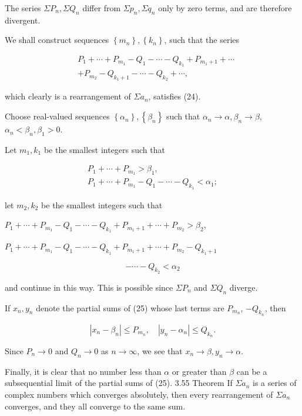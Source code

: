 \documentclass[10pt]{article}
\begin{document}
The series $\Sigma P_{n}, \Sigma Q_{n}$ differ from $\Sigma p_{n}, \Sigma q_{n}$ only by zero terms, and are therefore divergent.

We shall construct sequences $\left\{m_{n}\right\},\left\{k_{n}\right\}$, such that the series

$$
\begin{aligned}
& P_{1}+\cdots+P_{m_{1}}-Q_{1}-\cdots-Q_{k_{1}}+P_{m_{1}+1}+\cdots \\
&+P_{m_{2}}-Q_{k_{1}+1}-\cdots-Q_{k_{2}}+\cdots,
\end{aligned}
$$

which clearly is a rearrangement of $\Sigma a_{n}$, satisfies (24).

Choose real-valued sequences $\left\{\alpha_{n}\right\},\left\{\beta_{n}\right\}$ such that $\alpha_{n} \rightarrow \alpha, \beta_{n} \rightarrow \beta$, $\alpha_{n}<\beta_{n}, \beta_{1}>0$.

Let $m_{1}, k_{1}$ be the smallest integers such that

$$
\begin{gathered}
P_{1}+\cdots+P_{m_{1}}>\beta_{1}, \\
P_{1}+\cdots+P_{m_{1}}-Q_{1}-\cdots-Q_{k_{1}}<\alpha_{1} ;
\end{gathered}
$$

let $m_{2}, k_{2}$ be the smallest integers such that

$P_{1}+\cdots+P_{m_{1}}-Q_{1}-\cdots-Q_{k_{1}}+P_{m_{1}+1}+\cdots+P_{m_{2}}>\beta_{2}$,

$P_{1}+\cdots+P_{m_{1}}-Q_{1}-\cdots-Q_{k_{1}}+P_{m_{1}+1}+\cdots+P_{m_{2}}-Q_{k_{1}+1}$

$$
-\cdots-Q_{k_{2}}<\alpha_{2}
$$

and continue in this way. This is possible since $\Sigma P_{n}$ and $\Sigma Q_{n}$ diverge.

If $x_{n}, y_{n}$ denote the partial sums of (25) whose last terms are $P_{m_{n}}$, $-Q_{k_{n}}$, then

$$
\left|x_{n}-\beta_{n}\right| \leq P_{m_{n}}, \quad\left|y_{n}-\alpha_{n}\right| \leq Q_{k_{n}} .
$$

Since $P_{n} \rightarrow 0$ and $Q_{n} \rightarrow 0$ as $n \rightarrow \infty$, we see that $x_{n} \rightarrow \beta, y_{n} \rightarrow \alpha$.

Finally, it is clear that no number less than $\alpha$ or greater than $\beta$ can be a subsequential limit of the partial sums of (25). 3.55 Theorem If $\Sigma a_{n}$ is a series of complex numbers which converges absolutely, then every rearrangement of $\Sigma a_{n}$ converges, and they all converge to the same sum.
\end{document}
